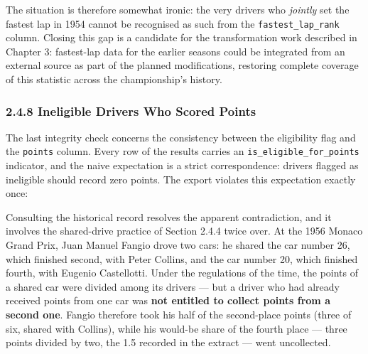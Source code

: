 \documentclass[
]{article}
\begin{document}
The situation is therefore somewhat ironic: the very drivers who
\emph{jointly} set the fastest lap in 1954 cannot be recognised as such
from the \texttt{fastest\_lap\_rank} column. Closing this gap is a
candidate for the transformation work described in Chapter 3:
fastest-lap data for the earlier seasons could be integrated from an
external source as part of the planned modifications, restoring complete
coverage of this statistic across the championship's history.

\subsubsection{2.4.8 Ineligible Drivers Who Scored
Points}\label{ineligible-drivers-who-scored-points}

The last integrity check concerns the consistency between the
eligibility flag and the \texttt{points} column. Every row of the
results carries an \texttt{is\_eligible\_for\_points} indicator, and the
naive expectation is a strict correspondence: drivers flagged as
ineligible should record zero points. The export violates this
expectation exactly once:

\begin{table}[!h]
\centering\begingroup\fontsize{8}{10}\selectfont

\endgroup{}
\end{table}

Consulting the historical record resolves the apparent contradiction,
and it involves the shared-drive practice of Section 2.4.4 twice over.
At the 1956 Monaco Grand Prix, Juan Manuel Fangio drove two cars: he
shared the car number 26, which finished second, with Peter Collins, and
the car number 20, which finished fourth, with Eugenio Castellotti.
Under the regulations of the time, the points of a shared car were
divided among its drivers --- but a driver who had already received
points from one car was \textbf{not entitled to collect points from a
second one}. Fangio therefore took his half of the second-place points
(three of six, shared with Collins), while his would-be share of the
fourth place --- three points divided by two, the 1.5 recorded in the
extract --- went uncollected.
\end{document}
